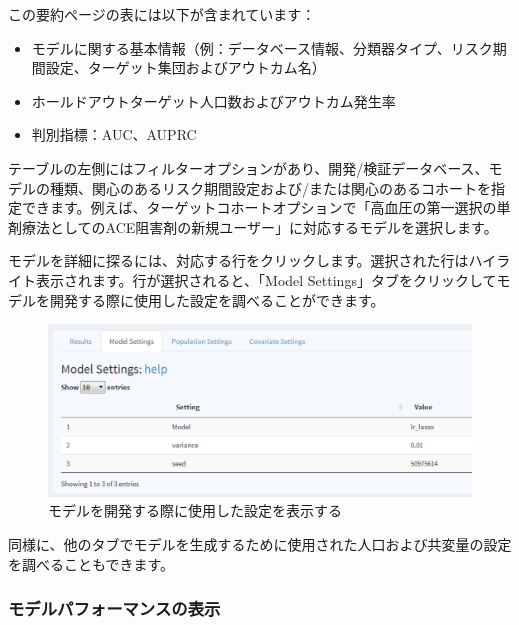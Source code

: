 \documentclass[
  11pt]{book}
\providecommand{\tightlist}{%
  \setlength{\itemsep}{0pt}\setlength{\parskip}{0pt}}
\theoremstyle{definition}
\theoremstyle{definition}
\theoremstyle{definition}
\theoremstyle{definition}
\theoremstyle{remark}
\begin{document}
この要約ページの表には以下が含まれています：

\begin{itemize}
\tightlist
\item
  モデルに関する基本情報（例：データベース情報、分類器タイプ、リスク期間設定、ターゲット集団およびアウトカム名）
\item
  ホールドアウトターゲット人口数およびアウトカム発生率
\item
  判別指標：AUC、AUPRC
\end{itemize}

テーブルの左側にはフィルターオプションがあり、開発/検証データベース、モデルの種類、関心のあるリスク期間設定および/または関心のあるコホートを指定できます。例えば、ターゲットコホートオプションで「高血圧の第一選択の単剤療法としてのACE阻害剤の新規ユーザー」に対応するモデルを選択します。

モデルを詳細に探るには、対応する行をクリックします。選択された行はハイライト表示されます。行が選択されると、「Model Settings」タブをクリックしてモデルを開発する際に使用した設定を調べることができます。

\begin{figure}

{\centering \includegraphics[width=1\linewidth]{images/PatientLevelPrediction/shiny/shinyModel} 

}

\caption{モデルを開発する際に使用した設定を表示する}\label{fig:shinyModel}
\end{figure}

同様に、他のタブでモデルを生成するために使用された人口および共変量の設定を調べることもできます。

\subsubsection*{モデルパフォーマンスの表示}\label{ux30e2ux30c7ux30ebux30d1ux30d5ux30a9ux30fcux30deux30f3ux30b9ux306eux8868ux793a}
\end{document}
